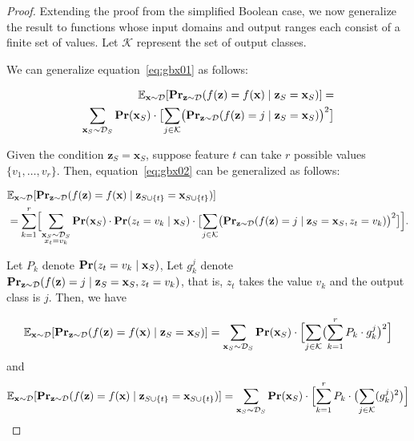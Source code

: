 \documentclass{article}
\newcommand{\z}{\textbf{z}}
\newcommand{\x}{\textbf{x}}
\newcommand{\fml}[1]{{\mathcal{#1}}}
\newcommand{\mbf}[1]{\ensuremath\mathbf{#1}}
\newcommand{\mbb}[1]{\ensuremath\mathbb{#1}}
\begin{document}
\begin{proof}
Extending the proof from the simplified Boolean case, we now generalize the result to functions whose input domains and output ranges each consist of a finite set of values. Let $\fml{K}$ represent the set of output classes.


We can generalize equation~\ref{eq:gbx01} as follows:

\begin{equation} \label{eq:gbx04}
\begin{aligned}
\mbb{E}_{\x\sim \mathcal{D}}[\mbf{Pr}_{\z\sim \mathcal{D}}(f(\z) = f(\x) \mid \z_{S} = \x_{S})]
= \\ \sum_{\x_{S}\sim \mathcal{D}_{S}} \mbf{Pr}(\x_{S}) \cdot \bigl[\sum_{j \in \fml{K}} \bigl(\mbf{Pr}_{\z\sim \mathcal{D}}(f(\z) = j \mid \z_{S} = \x_{S})\bigr)^2\bigr]
\end{aligned}
\end{equation}


Given the condition $\z_{S} = \x_{S}$, suppose feature $t$ can take $r$ possible values $\{v_1, \dots, v_r\}$.
Then, equation~\ref{eq:gbx02} can be generalized as follows:

\begin{equation} \label{eq:gbx05}
\begin{aligned}
&\mbb{E}_{\x\sim \mathcal{D}}[\mbf{Pr}_{\z\sim \mathcal{D}}(f(\z) = f(\x) \mid \z_{S\cup\{t\}} = \x_{S\cup\{t\}})] \\
&= \sum_{k = 1}^{r} \Bigl[ \sum_{\substack{\x_{S}\sim \fml{D}_{S} \\ x_t = v_k}} 
\mbf{Pr}(\x_{S}) \cdot \mbf{Pr}(z_t = v_k \mid \x_{S}) \cdot \bigl[\sum_{j \in \fml{K}} \bigl(\mbf{Pr}_{\z\sim \mathcal{D}}(f(\z) = j \mid \z_{S} = \x_{S}, z_t = v_k)\bigr)^2\bigr] \Bigr].
\end{aligned}
\end{equation}


Let $P_{k}$ denote $\mbf{Pr}(z_t = v_k \mid \x_{S})$,
Let $g_{k}^{j}$ denote $\mbf{Pr}_{\z\sim \mathcal{D}}(f(\z) = j \mid \z_{S} = \x_{S}, z_t = v_k)$, 
that is, $z_t$ takes the value $v_k$ and the output class is $j$.
Then, we have

\begin{equation}
\mbb{E}_{\x\sim \mathcal{D}}[\mbf{Pr}_{\z\sim \mathcal{D}}(f(\z) = f(\x) \mid \z_{S} = \x_{S})]
= \sum_{\x_{S}\sim \fml{D}_{S}} \mbf{Pr}(\x_{S}) \cdot \Bigl[\sum_{j \in \fml{K}} \bigl(\sum^{r}_{k=1} P_{k} \cdot g_{k}^{j}\bigr)^2 \Bigr]
\end{equation}
%
and
\[
\mbb{E}_{\x\sim \mathcal{D}}[\mbf{Pr}_{\z\sim \mathcal{D}}(f(\z) = f(\x) \mid \z_{S\cup\{t\}} = \x_{S\cup\{t\}})]
= \sum_{\x_{S}\sim \fml{D}_{S}} \mbf{Pr}(\x_{S}) \cdot \Bigl[\sum^{r}_{k=1} P_{k} \cdot \bigl(\sum_{j \in \fml{K}} (g_{k}^{j})^2\bigr) \Bigr]
\]



\end{proof}
\end{document}
